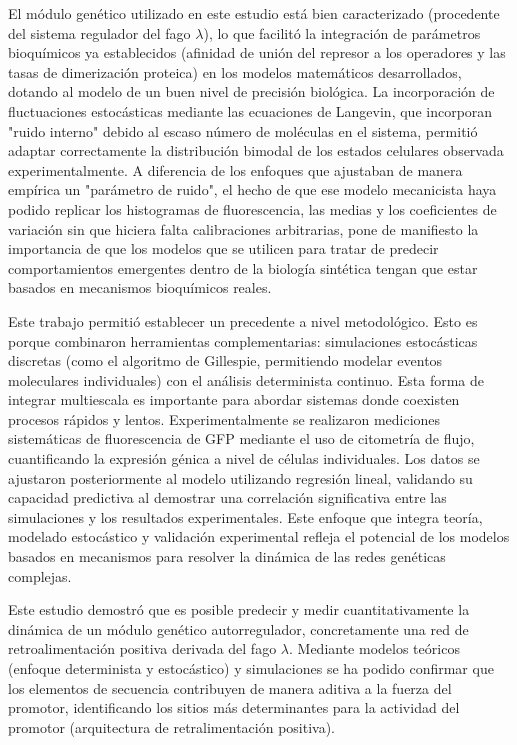 \documentclass[nochap]{config/ejercicios}
\begin{document}
El módulo genético utilizado en este estudio está bien caracterizado (procedente del sistema regulador del fago $\lambda$), lo que facilitó la integración de parámetros bioquímicos ya establecidos (afinidad de unión del represor a los operadores y las tasas de dimerización proteica) en los modelos matemáticos desarrollados, dotando al modelo de un buen nivel de precisión biológica. La incorporación de fluctuaciones estocásticas mediante las ecuaciones de Langevin, que incorporan "ruido interno" debido al escaso número de moléculas en el sistema, permitió adaptar correctamente la distribución bimodal de los estados celulares observada experimentalmente. A diferencia de los enfoques que ajustaban de manera empírica un "parámetro de ruido", el hecho de que ese modelo mecanicista haya podido replicar los histogramas de fluorescencia, las medias y los coeficientes de variación sin que hiciera falta calibraciones arbitrarias, pone de manifiesto la importancia de que los modelos que se utilicen para tratar de predecir comportamientos emergentes dentro de la biología sintética tengan que estar basados en mecanismos bioquímicos reales.

Este trabajo permitió establecer un precedente a nivel metodológico. Esto es porque combinaron herramientas complementarias: simulaciones estocásticas discretas (como el algoritmo de Gillespie, permitiendo modelar eventos moleculares individuales) con el análisis determinista continuo. Esta forma de integrar multiescala es importante para abordar sistemas donde coexisten procesos rápidos y lentos. Experimentalmente se realizaron mediciones sistemáticas de fluorescencia de GFP mediante el uso de citometría de flujo, cuantificando la expresión génica a nivel de células individuales. Los datos se ajustaron posteriormente al modelo utilizando regresión lineal, validando su capacidad predictiva al demostrar una correlación significativa entre las simulaciones y los resultados experimentales. Este enfoque que integra teoría, modelado estocástico y validación experimental refleja el potencial de los modelos basados en mecanismos para resolver la dinámica de las redes genéticas complejas.



Este estudio demostró que es posible predecir y medir cuantitativamente la dinámica de un módulo genético autorregulador, concretamente una red de retroalimentación positiva derivada del fago $\lambda$. Mediante modelos teóricos (enfoque determinista y estocástico) y simulaciones se ha podido confirmar que los elementos de secuencia contribuyen de manera aditiva a la fuerza del promotor, identificando los sitios más determinantes para la actividad del promotor (arquitectura de retralimentación positiva).
\end{document}
